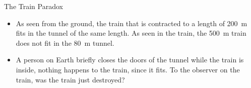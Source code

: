 \documentclass[aspectratio=169,
hyperref={colorlinks,urlcolor=blue}
]{beamer}
\begin{document}
\begin{frame}{The Train Paradox}
\vspace{-1cm}
\begin{itemize}
\item As seen from the ground, the train that is contracted to a length of \SI{200}{m} fits in the tunnel of the same length. As seen in the train, the \SI{500}{m} train does not fit in the \SI{80}{m} tunnel. 
\item A person on Earth briefly closes the doors of the tunnel while the train is inside, nothing happens to the train, since it fits. To the observer on the train, was the train just destroyed?
\end{itemize}
\end{frame}



























































\end{document}
